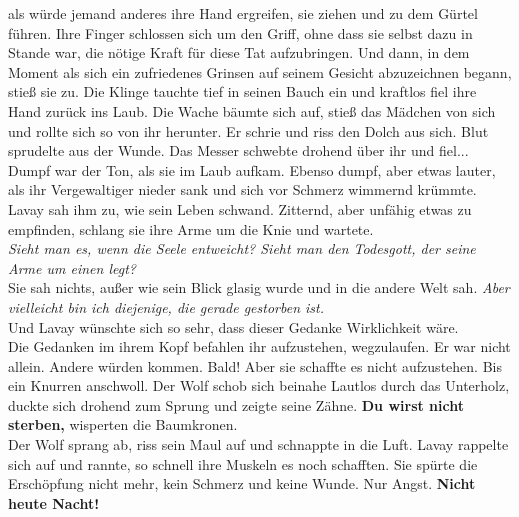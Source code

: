 als würde jemand anderes ihre Hand ergreifen, sie ziehen und zu dem Gürtel führen. Ihre Finger 
schlossen sich um den Griff, ohne dass sie selbst dazu in Stande war, die nötige Kraft für diese 
Tat aufzubringen. Und dann, in dem Moment als sich ein zufriedenes Grinsen auf seinem Gesicht 
abzuzeichnen begann, stieß sie zu. Die Klinge tauchte tief in seinen Bauch ein und kraftlos fiel 
ihre Hand zurück ins Laub. Die Wache bäumte sich auf, stieß das Mädchen von sich und rollte sich so 
von ihr herunter. Er schrie und riss den Dolch aus sich. Blut sprudelte aus der Wunde. Das 
Messer schwebte drohend über ihr und fiel... Dumpf war der Ton, als sie im Laub aufkam. Ebenso 
dumpf, aber etwas lauter, als ihr Vergewaltiger nieder sank und sich vor Schmerz wimmernd 
krümmte. Lavay sah ihm zu, wie sein Leben schwand. Zitternd, aber unfähig etwas zu empfinden, 
schlang sie ihre Arme um die Knie und wartete.\\
\textit{Sieht man es, wenn die Seele entweicht? Sieht man den Todesgott, der seine Arme um einen 
legt?}\\
Sie sah nichts, außer wie sein Blick glasig wurde und in die andere Welt sah. \textit{Aber 
vielleicht bin ich diejenige, die gerade gestorben ist.}\\
Und Lavay wünschte sich so sehr, dass dieser Gedanke Wirklichkeit wäre.\\
Die Gedanken im ihrem Kopf befahlen ihr aufzustehen, wegzulaufen. Er war nicht allein. Andere 
würden kommen. Bald! Aber sie schaffte es nicht aufzustehen. Bis ein Knurren anschwoll. Der Wolf 
schob sich beinahe Lautlos durch das Unterholz, duckte sich drohend zum Sprung und zeigte seine 
Zähne. \textbf{Du wirst nicht sterben,} wisperten die Baumkronen.\\
Der Wolf sprang ab, riss sein Maul auf und schnappte in die Luft. Lavay rappelte sich auf und 
rannte, so schnell ihre Muskeln es noch schafften. Sie spürte die Erschöpfung nicht mehr, kein 
Schmerz und keine Wunde. Nur Angst. \textbf{Nicht heute Nacht!}\\


